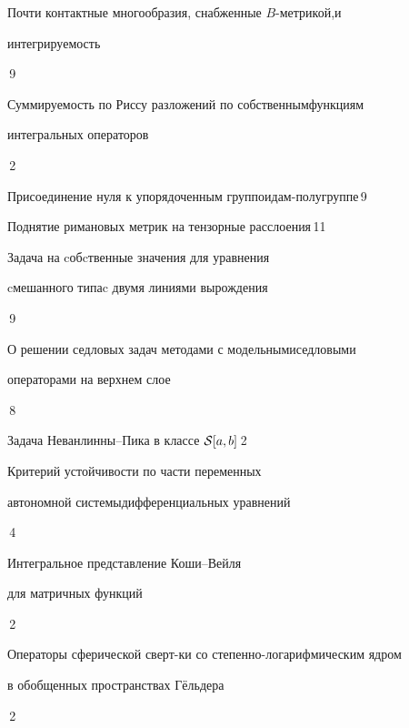 

{Почти контактные многообразия, снабженные $B$-метрикой,\newline и 


интегрируемость}{\No\,9}




{Суммируемость по Риссу разложений по собственным\newline функциям


интегральных операторов}{\No\,2}




{Присоединение нуля к упорядоченным группоидам-\newline полугруппе}{\No\,9}




{Поднятие римановых метрик на тензорные расслоения}{\No\,11}




{Задача на cобcтвенные значения для уравнения 


cмешанного типа\newline c двумя линиями вырождения}{\No\,9}




{О решении седловых задач методами с модельными\newline седловыми


операторами на верхнем слое}{\No\,8}




{Задача Неванлинны--Пика в классе ${\cal S}[a,b]$}{\No\,2}




{Критерий устойчивости по части переменных 


автономной системы\newline дифференциальных уравнений}{\No\,4}




{Интегральное представление Коши--Вейля


для матричных функций}{\No\,2}




{Операторы сферической сверт-\newline ки со степенно-логарифмическим ядром 


в обобщенных пространствах Г\"ельдера}{\No\,2}


